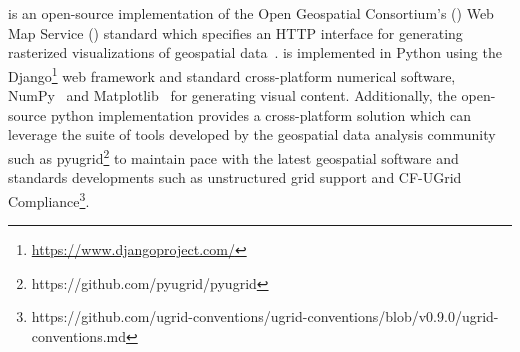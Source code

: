 
\section{\sciwms{}}
\label{sec:sciwms}
\Sciwms{} is an open-source implementation of the Open Geospatial
Consortium's (\ogc{}) Web Map Service (\wms{}) standard which
specifies an HTTP interface for generating rasterized visualizations
of geospatial data~\cite{wms14}. \sciwms{} is implemented in Python
using the Django\footnote{\url{https://www.djangoproject.com/}} web
framework and standard cross-platform numerical software,
NumPy~\cite{numpy11} and Matplotlib~\cite{hunter07} for generating
visual content. Additionally, the open-source python implementation
provides a cross-platform \wms{} solution which can leverage the suite
of tools developed by the geospatial data analysis community such as
pyugrid\footnote{https://github.com/pyugrid/pyugrid} to maintain pace
with the latest geospatial software and standards developments such as
unstructured grid support and CF-UGrid
Compliance\footnote{https://github.com/ugrid-conventions/ugrid-conventions/blob/v0.9.0/ugrid-conventions.md}.

